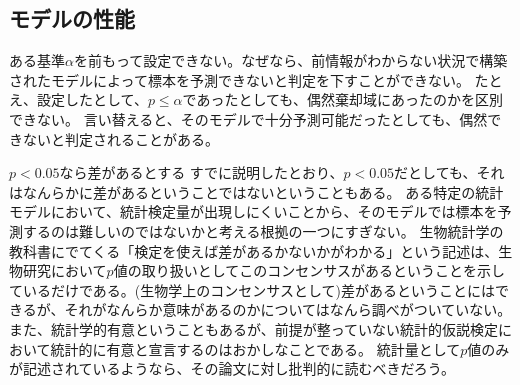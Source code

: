 \subsection{モデルの性能}
ある基準$\alpha$を前もって設定できない。なぜなら、前情報がわからない状況で構築されたモデルによって標本を予測できないと判定を下すことができない。
たとえ、設定したとして、$p \leq \alpha$であったとしても、偶然棄却域にあったのかを区別できない。
言い替えると、そのモデルで十分予測可能だったとしても、偶然できないと判定されることがある。




\begin{SMbox}{$p<0.05$なら差があるとする}
 すでに説明したとおり、$p<0.05$だとしても、それはなんらかに差があるということではないということもある。 ある特定の統計モデルにおいて、統計検定量が出現しにくいことから、そのモデルでは標本を予測するのは難しいのではないかと考える根拠の一つにすぎない。 生物統計学の教科書にでてくる「検定を使えば差があるかないかがわかる」という記述は、生物研究において$p$値の取り扱いとしてこのコンセンサスがあるということを示しているだけである。(生物学上のコンセンサスとして)差があるということにはできるが、それがなんらか意味があるのかについてはなんら調べがついていない。また、統計学的有意ということもあるが、前提が整っていない統計的仮説検定において統計的に有意と宣言するのはおかしなことである。
 統計量として$p$値のみが記述されているようなら、その論文に対し批判的に読むべきだろう。
\end{SMbox}

